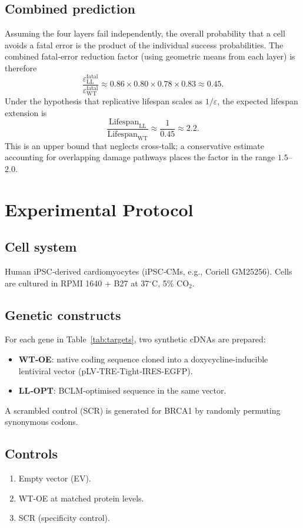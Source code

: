 \documentclass[12pt,a4paper]{article}
\begin{document}
	\subsection{Combined prediction}
	Assuming the four layers fail independently, the overall probability that a cell avoids a fatal error is the product of the individual success probabilities. The combined fatal‑error reduction factor (using geometric means from each layer) is therefore
	\[
	\frac{\varepsilon_{\mathrm{LL}}^{\mathrm{fatal}}}{\varepsilon_{\mathrm{WT}}^{\mathrm{fatal}}} \approx 0.86 \times 0.80 \times 0.78 \times 0.83 \approx 0.45.
	\]
	Under the hypothesis that replicative lifespan scales as \(1/\varepsilon\), the expected lifespan extension is
	\[
	\frac{\mathrm{Lifespan}_{\mathrm{LL}}}{\mathrm{Lifespan}_{\mathrm{WT}}} \approx \frac{1}{0.45} \approx 2.2.
	\]
	This is an upper bound that neglects cross‑talk; a conservative estimate accounting for overlapping damage pathways places the factor in the range \(1.5\)–\(2.0\).
	
	\section{Experimental Protocol}
	\label{sec:protocol}
	
	\subsection{Cell system}
	Human iPSC‑derived cardiomyocytes (iPSC‑CMs, e.g., Coriell GM25256). Cells are cultured in RPMI 1640 + B27 at 37\(^\circ\)C, 5\% CO\(_2\).
	
	\subsection{Genetic constructs}
	For each gene in Table~\ref{tab:targets}, two synthetic cDNAs are prepared:
	\begin{itemize}
		\item \textbf{WT‑OE}: native coding sequence cloned into a doxycycline‑inducible lentiviral vector (pLV‑TRE‑Tight‑IRES‑EGFP).
		\item \textbf{LL‑OPT}: BCLM‑optimised sequence in the same vector.
	\end{itemize}
	A scrambled control (SCR) is generated for BRCA1 by randomly permuting synonymous codons.
	
	\subsection{Controls}
	\begin{enumerate}
		\item Empty vector (EV).
		\item WT‑OE at matched protein levels.
		\item SCR (specificity control).
	\end{enumerate}
	
\end{document}
